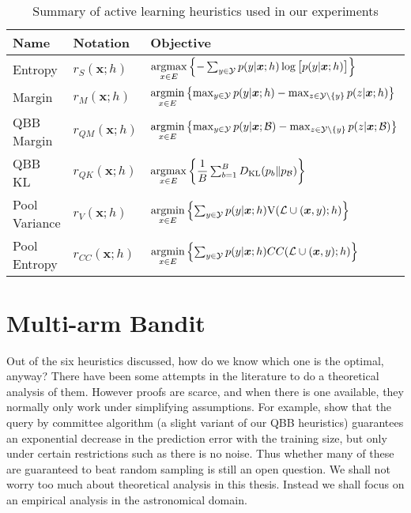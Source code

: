 \begin{table}[h]
	\caption {Summary of active learning heuristics used in our experiments} \label{tab:heuristics}
	\centering
	\begin{tabular}{lll}
		\toprule
		{Name}  & Notation &  Objective  \\
		\midrule
		Entropy & $r_S(\bm{x}; h)$
			& $\argmax_{x \in E} \left\{-\sum_{y \in \Y} p(y | \bm{x}; h)
            \log \big[ p(y | \bm{x}; h) \big] \right\}$
			\\[2ex]
		Margin & $r_M(\bm{x}; h)$
			& $\argmin_{x \in E} \left\{ \max_{y \in \Y} p(y | \bm{x}; h) -
            \max_{z \in \Y \setminus \{y\}} p(z | \bm{x}; h)  \right\}$
			\\[2ex]
		QBB Margin & $r_{QM}(\bm{x}; h)$
			& $\argmin_{x \in E} \left\{ \max_{y \in \Y} p(y | \bm{x}; \B) -
            \max_{z \in \Y \setminus \{y\}} p(z | \bm{x}; \B)  \right\}$
			\\[2ex]
		QBB KL & $r_{QK}(\bm{x}; h)$
			& $\argmax_{x \in E} \left\{ \dfrac{1}{B}
               \sum_{b=1}^B D_{\mathrm{KL}}(p_b\|p_\B) \right\}$
			\\[2ex]
		Pool Variance & $r_V(\bm{x}; h)$
			& $\argmin_{x \in E} \left\{ \sum_{y \in \Y} p(y | \bm{x}; h)
            \text{V}(\Labelled \cup (\bm{x}, y); h)  \right\}$
			\\[2ex]
		Pool Entropy & $r_{CC}(\bm{x}; h)$
			& $\argmin_{x \in E} \left\{ \sum_{y\in \Y} p(y|\bm{x}; h) 
               CC(\Labelled \cup (\bm{x}, y); h) \right\}  $
			\\
		\bottomrule
	\end{tabular}
\end{table}


\section{Multi-arm Bandit}
\label{sec:bandit}

Out of the six heuristics discussed, how do we know which one is the optimal, anyway? There have
been some attempts in the literature to do a theoretical analysis of them. However proofs are
scarce, and when there is one available, they normally only work under simplifying assumptions. For
example,  show that the query by committee algorithm (a slight variant of our
QBB heuristics) guarantees an exponential decrease in the prediction error with the training size,
but only under certain restrictions such as there is no noise. Thus whether many of these are
guaranteed to beat random sampling is still an open question. We shall not worry too much about
theoretical analysis in this thesis. Instead we shall focus on an empirical analysis in the
astronomical domain.

